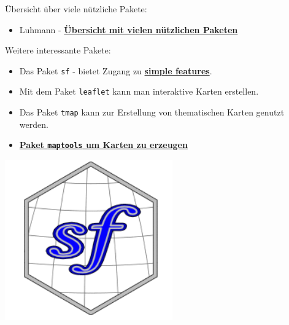 \documentclass[ignorenonframetext,]{beamer}
\providecommand{\tightlist}{%
  \setlength{\itemsep}{0pt}\setlength{\parskip}{0pt}}
\begin{document}
\begin{frame}[fragile]{Übersicht über viele nützliche Pakete:}

\begin{itemize}
\tightlist
\item
  Luhmann -
  \href{http://www.beltz.de/fileadmin/beltz/downloads/OnlinematerialienPVU/28090_Luhmann/Verwendete\%20Pakete.pdf}{\textbf{Übersicht
  mit vielen nützlichen Paketen}}
\end{itemize}

\begin{block}{Weitere interessante Pakete:}

\begin{itemize}
\tightlist
\item
  Das Paket \texttt{sf} - bietet Zugang zu
  \href{https://de.wikipedia.org/wiki/Simple_Feature_Access}{\textbf{simple
  features}}.
\item
  Mit dem Paket \texttt{leaflet} kann man interaktive Karten erstellen.
\item
  Das Paket \texttt{tmap} kann zur Erstellung von thematischen Karten
  genutzt werden.
\item
  \href{http://www.r-bloggers.com/tag/maptools/}{\textbf{Paket
  \texttt{maptools} um Karten zu erzeugen}}
\end{itemize}

\includegraphics{figure/logo_sf.PNG}

\end{block}

\end{frame}
\end{document}

